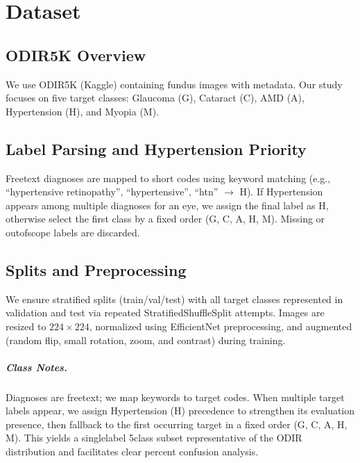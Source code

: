\chapter{Dataset}\label{sec:dataset}
\section{ODIR\textendash 5K Overview}
We use ODIR\textendash 5K (Kaggle) \cite{odir5k} containing fundus images with metadata. Our study focuses on five target classes: Glaucoma (G), Cataract (C), AMD (A), Hypertension (H), and Myopia (M).

\section{Label Parsing and Hypertension Priority}
Free\textendash text diagnoses are mapped to short codes using keyword matching (e.g., ``hypertensive retinopathy'', ``hypertensive'', ``htn'' $\rightarrow$ H). If Hypertension appears among multiple diagnoses for an eye, we assign the final label as H, otherwise select the first class by a fixed order (G, C, A, H, M). Missing or out\textendash of\textendash scope labels are discarded.

\section{Splits and Preprocessing}
We ensure stratified splits (train/val/test) with all target classes represented in validation and test via repeated StratifiedShuffleSplit attempts. Images are resized to $224\times224$, normalized using EfficientNet preprocessing, and augmented (random flip, small rotation, zoom, and contrast) during training.

\paragraph{Class Notes.} Diagnoses are free\textendash text; we map keywords to target codes. When multiple target labels appear, we assign Hypertension (H) precedence to strengthen its evaluation presence, then fallback to the first occurring target in a fixed order (G, C, A, H, M). This yields a single\textendash label 5\textendash class subset representative of the ODIR distribution and facilitates clear percent confusion analysis.

